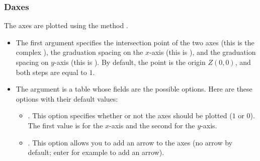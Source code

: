 \subsubsection{Daxes}
The axes are plotted using the method .
\begin{itemize}
    \item The first argument specifies the intersection point of the two axes (this is the complex ), the graduation spacing on the $x$-axis (this is ), and the graduation spacing on $y$-axis (this is ). By default, the point  is the origin $Z(0,0)$, and both steps are equal to $1$.
    \item The argument  is a table whose fields are the possible options. Here are these options with their default values:

    \begin{itemize}
        \item {}. This option specifies whether or not the axes should be plotted ($1$ or $0$). The first value is for the $x$-axis and the second for the $y$-axis.
    
        \item {}. This option allows you to add an arrow to the axes (no arrow by default; enter for example to add an arrow).
    

\end{itemize}
\end{itemize}
